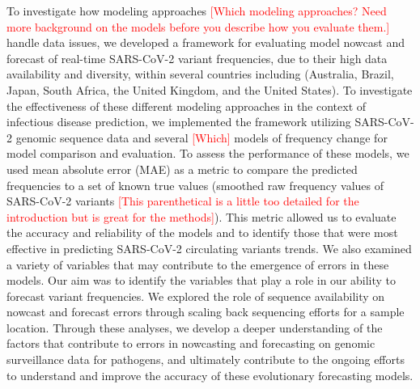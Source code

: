 \documentclass[11pt,oneside,letterpaper]{article}
\def\jhc#1{\textcolor{red}{[#1]}}
\begin{document}
To investigate how modeling approaches \jhc{Which modeling approaches? Need more background on the models before you describe how you evaluate them.} handle data issues, we developed a framework for evaluating model nowcast and forecast of real-time SARS-CoV-2 variant frequencies, due to their high data availability and diversity, within several countries including (Australia, Brazil, Japan, South Africa, the
United Kingdom, and the United States).
To investigate the effectiveness of these different modeling approaches in the context of infectious disease prediction, we implemented the framework utilizing SARS-CoV-2 genomic sequence data and several \jhc{Which} models of frequency change for model comparison and evaluation.
To assess the performance of these models, we used mean absolute error (MAE) as a metric to compare the predicted frequencies to a set of known true values (smoothed raw frequency values of SARS-CoV-2 variants \jhc{This parenthetical is a little too detailed for the introduction but is great for the methods}). %
This metric allowed us to evaluate the accuracy and reliability of the models and to identify those that were most effective in predicting SARS-CoV-2 circulating variants trends.
We also examined a variety of variables that may contribute to the emergence of errors in these models.
Our aim was to identify the variables that play a role in our ability to forecast variant frequencies.
We explored the role of sequence availability on nowcast and forecast errors through scaling back sequencing efforts for a sample location. 
Through these analyses, we develop a deeper understanding of the factors that contribute to errors in nowcasting and forecasting on genomic surveillance data for pathogens, and ultimately contribute to the ongoing efforts to understand and improve the accuracy of these evolutionary forecasting models.



\end{document}
